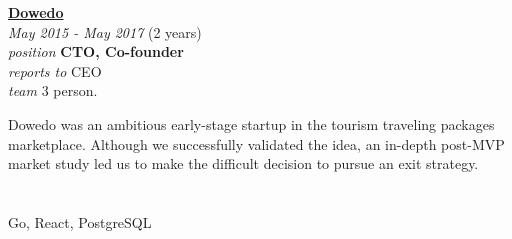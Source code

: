 \documentclass[12pt]{res} %
\begin{document}
\begin{resume}
\vspace{16pt} %
\begin{minipage}[t]{6.5cm}
\begin{flushleft}
	{\large {\bf \href{https://dowedo.id}{Dowedo}}} \\
	{\footnotesize{\sl May 2015 - May 2017} \hfill (2 years)}\\
	{\footnotesize{\sl position} \hfill \bf{CTO, Co-founder}}\\
	{\footnotesize{\sl reports to} \hfill CEO}\\
	{\footnotesize{\sl team} \hfill 3 person.}\\
\end{flushleft}
\end{minipage}
\hspace{0.5cm}
\begin{minipage}[t]{0.56\linewidth}
	Dowedo was an ambitious early-stage startup in the tourism traveling packages marketplace. Although we successfully validated the idea, an in-depth post-MVP market study led us to make the difficult decision to pursue an exit strategy.
\end{minipage}

	\section{}
	\vspace{-10pt}
	\begin{flushleft}
		Go, React, PostgreSQL
	\end{flushleft}

\begin{minipage}[t]{0.48\linewidth}

\end{minipage}
\end{resume}
\end{document}
